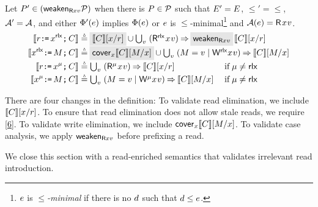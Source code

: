 \begin{definition}
  Let $P'\in(\mathsf{weaken}_{\mathsf{R}xv}\mathcal{P})$ %
  when there is $P\in\mathcal{P}$ such that $E' = E$,
  ${\le'} = {\le}$, $\mathcal{A}' = \mathcal{A}$, and either
  $\Phi'(e)$ implies $\Phi(e)$ or $e$ is
  $\le$-minimal\footnote{$e$ is \emph{$\le$-minimal} if there is no $d$
    such that $d\le e$.} and
  $\labelingAct(\aEv)=\DR[\modeRLXquiet]{\aLoc}{\aVal}$.
  \begin{align*}
    \sem{\aReg\GETS\aLoc^\modeRLX\SEMI \aCmd} &\eqdef\;\mathhl{
      \sem{\aCmd}[\aLoc/\aReg]}\;
    \cup
    \textstyle\bigcup_\aVal\;
    (\DR[\modeRLX]\aLoc\aVal) \prefix \;\mathhl{\Rdis{\aLoc}{\aVal}}\;\,
    \sem{\aCmd} [\aLoc/\aReg]
    \\
    \sem{\aLoc^\modeRLX\GETS\aExp\SEMI \aCmd} & \eqdef
    \;\mathhl{%
      \relfilt[]{\aLoc} \sem{\aCmd}[\aExp/\aLoc]
    }\;
    \cup
    \textstyle\bigcup_\aVal\; (\aExp=\aVal \mid \DW[\modeRLX]\aLoc\aVal) \prefix \sem{\aCmd}[\aExp/\aLoc]
    \\
    \begin{aligned}
      \sem{\aReg\GETS\aLoc^\amode\SEMI \aCmd}
      \\
      \sem{\aLoc^\amode\GETS\aExp\SEMI \aCmd}
    \end{aligned}
    &
    \begin{aligned}
      &\eqdef \textstyle\bigcup_\aVal\;
      (\DRmode\aLoc\aVal) \prefix \sem{\aCmd} [\aLoc/\aReg]
      &&\textif \amode\neq\modeRLX
      \\
      &\eqdef
      \textstyle\bigcup_\aVal\; (\aExp=\aVal \mid \DWmode\aLoc\aVal)
      \prefix \sem{\aCmd}[\aExp/\aLoc]
      &&\textif \amode\neq\modeRLX      
    \end{aligned}
  \end{align*}
\end{definition}
There are four changes in the definition: To validate read elimination,
we include $\llbracket C\rrbracket[x/r]$.  To ensure that read elimination does
not allow stale reads, we require \ref{6}.  To validate write elimination, we
include $\relfilt[]{\aLoc} \sem{\aCmd}[\aExp/\aLoc]$. To validate case analysis, we apply
$\mathsf{weaken}_{\mathsf{R}xv}$ before prefixing a read.  

We close this section with a read-enriched semantics that validates
irrelevant read introduction.


